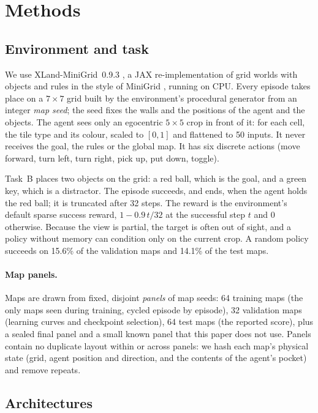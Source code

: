 \section{Methods}
\label{sec:methods}

\subsection{Environment and task}
\label{sec:env}

We use XLand-MiniGrid~0.9.3 \citep{nikulin2024xland}, a JAX re-implementation of grid worlds
with objects and rules in the style of MiniGrid \citep{chevalierboisvert2023minigrid}, running on
CPU. Every episode takes place on a $7\times7$ grid built by the environment's procedural
generator from an integer \emph{map seed}; the seed fixes the walls and the positions of the
agent and the objects. The agent sees only an egocentric $5\times5$ crop in front of it: for
each cell, the tile type and its colour, scaled to $[0,1]$ and flattened to 50 inputs. It never
receives the goal, the rules or the global map. It has six discrete actions (move forward, turn
left, turn right, pick up, put down, toggle).

Task~B places two objects on the grid: a red ball, which is the goal, and a green key, which is a
distractor. The episode succeeds, and ends, when the agent holds the red ball; it is truncated
after 32 steps. The reward is the environment's default sparse success reward,
$1 - 0.9\,t/32$ at the successful step $t$ and $0$ otherwise. Because the view is partial, the
target is often out of sight, and a policy without memory can condition only on the current crop.
A random policy succeeds on 15.6\% of the validation maps and 14.1\% of the test maps.

\paragraph{Map panels.}
Maps are drawn from fixed, disjoint \emph{panels} of map seeds: 64 training maps (the only maps
seen during training, cycled episode by episode), 32 validation maps (learning curves and
checkpoint selection), 64 test maps (the reported score), plus a sealed final panel and a
small known panel that this paper does not use. Panels contain no duplicate layout within or
across panels: we hash each map's physical state (grid, agent position and direction, and the
contents of the agent's pocket) and remove repeats.

\subsection{Architectures}
\label{sec:arch}

